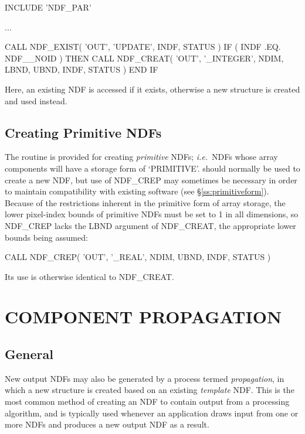 \documentclass[twoside,11pt,nolof]{starlink}
\providecommand{\st}[1]{{\emph{#1}}}
\begin{document}
\small
\begin{terminalv}
      INCLUDE 'NDF_PAR'

      ...

      CALL NDF_EXIST( 'OUT', 'UPDATE', INDF, STATUS )
      IF ( INDF .EQ. NDF__NOID ) THEN
         CALL NDF_CREAT( 'OUT', '_INTEGER', NDIM, LBND, UBND, INDF, STATUS )
      END IF
\end{terminalv}
\normalsize

Here, an existing NDF is accessed if it exists, otherwise a new structure
is created and used instead.

\subsection{\label{ss:crep}Creating Primitive NDFs}

The routine  is provided for creating
\st{primitive\/} NDFs; \st{i.e.}\ NDFs whose array components will
have a storage form of `PRIMITIVE'.
 should normally be used to create a new NDF, but use of NDF\_CREP
may sometimes be necessary in order to maintain compatibility with existing
software (see \S\ref{ss:primitiveform}).
Because of the restrictions inherent in the primitive form of array storage,
the lower pixel-index bounds of primitive NDFs must be set to 1 in all
dimensions, so NDF\_CREP lacks the LBND argument of NDF\_CREAT, the
appropriate lower bounds being assumed:

\small
\begin{terminalv}
      CALL NDF_CREP( 'OUT', '_REAL', NDIM, UBND, INDF, STATUS )
\end{terminalv}
\normalsize

Its use is otherwise identical to NDF\_CREAT.


\section{\label{ss:propagate}COMPONENT PROPAGATION}

\subsection{General}

New output NDFs may also be generated by a process termed \st{propagation},
in which a new structure is created based on an existing \st{template\/} NDF.
This is the most common method of creating an NDF to contain output from a
processing algorithm, and is typically used whenever an application draws
input from one or more NDFs and produces a new output NDF as a result.
\end{document}
